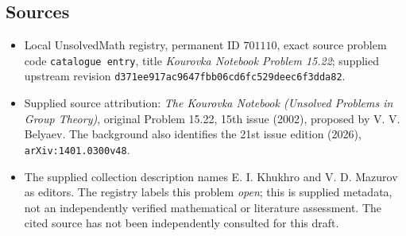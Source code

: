 \documentclass[11pt]{article}
\begin{document}
\subsection{Sources}
\begin{itemize}
\item Local UnsolvedMath registry, permanent ID \(701110\), exact source problem code \texttt{catalogue entry}, title \emph{Kourovka Notebook Problem 15.22}; supplied upstream revision \texttt{d371ee917ac9647fbb06cd6fc529deec6f3dda82}.
\item Supplied source attribution: \emph{The Kourovka Notebook (Unsolved Problems in Group Theory)}, original Problem 15.22, 15th issue (2002), proposed by V. V. Belyaev. The background also identifies the 21st issue edition (2026), \texttt{arXiv:1401.0300v48}.
\item The supplied collection description names E. I. Khukhro and V. D. Mazurov as editors. The registry labels this problem \emph{open}; this is supplied metadata, not an independently verified mathematical or literature assessment. The cited source has not been independently consulted for this draft.
\end{itemize}
\end{document}
